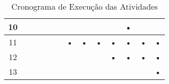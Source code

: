 \documentclass[12pt]{article}
\begin{document}
\begin{table}[htbp]
\begin{tabular}{|c|c|c|c|c|c|c|c|c|c|c|c|c|}
		10                  &            &            &           &            &            &           &            &            &           & •          &            &           \\ \hline
		11                  &            &            &           &            &            & •         & •          & •          & •         & •          & •          & •         \\ \hline
		12                  &            &            &           &            &            &           &            &            & •         & •          & •          & •         \\ \hline
		13                  &            &            &           &            &            &           &            &            &           &            &            & •         \\ \hline
		\end{tabular}
	\caption{Cronograma de Execução das Atividades}
	\label{tab:cronograma}
\end{table}


\end{document}

